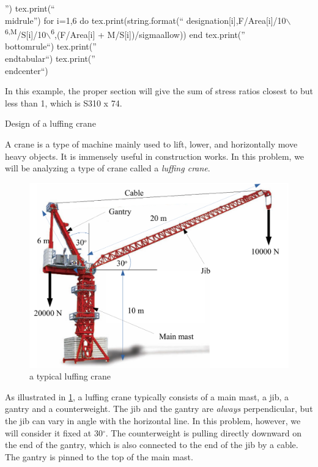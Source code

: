 \documentclass[a4paper,openany,nobib]{tufte-book}
\begin{document}
{{\begin{enumerate}
'') tex.print(``\\
midrule'') for i=1,6 do tex.print(string.format(``
designation[i],F/Area[i]/10$\backslash$\textsuperscript{6,M}/S[i]/10$\backslash$\textsuperscript{6},(F/Area[i] +
M/S[i])/sigmaallow)) end tex.print(''\\
bottomrule``) tex.print(''\\
endtabular``) tex.print(''\\
endcenter``)

In this example, the proper section will give the sum of stress ratios
closest to but less than 1, which is S310 x 74.

Design of a luffing crane

A crane is a type of machine mainly used to lift, lower, and
horizontally move heavy objects. It is immensely useful in construction
works. In this problem, we will be analyzing a type of crane called a
\emph{luffing crane}.


\begin{figure}[htbp]
\centering
\includegraphics[width=.9\linewidth]{pictures/Simple-load-bearing/tower-crane2.pdf}
\caption{\label{tower crane}a typical luffing crane}
\end{figure}

As illustrated in \ref{tower crane}, a luffing crane
typically consists of a main mast, a jib, a gantry and a counterweight.
The jib and the gantry are \emph{always} perpendicular, but the jib can vary
in angle with the horizontal line. In this problem, however, we will
consider it fixed at 30\(^{\circ}\). The counterweight is pulling directly
downward on the end of the gantry, which is also connected to the end of
the jib by a cable. The gantry is pinned to the top of the main mast.


\end{enumerate}}}
\end{document}
